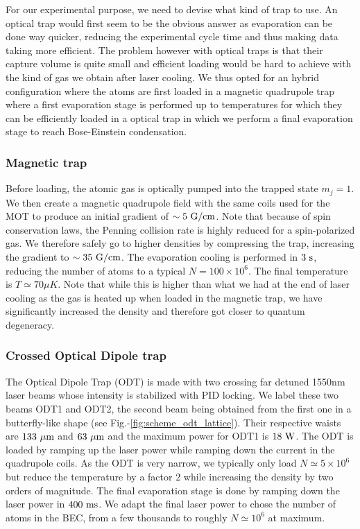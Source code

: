 For our experimental purpose, we need to devise what kind of trap to use. An optical trap would first seem to be the obvious answer as evaporation can be done way quicker, reducing the experimental cycle time and thus making data taking more efficient. The problem however with optical traps is that their capture volume is quite small and efficient loading would be hard to achieve with the kind of gas we obtain after laser cooling. We thus opted for an hybrid configuration where the atoms are first loaded in a magnetic quadrupole trap where a first evaporation stage is performed up to temperatures for which they can be efficiently loaded in a optical trap in which we perform a final evaporation stage to reach Bose-Einstein condensation.

\subsubsection{Magnetic trap}

Before loading, the atomic gas is optically pumped into the trapped state $m_j=1$. We then create a magnetic quadrupole field with the same coils used for the MOT to produce an initial gradient of $\sim 5 \ \rm{G/cm}$. Note that because of spin conservation laws, the Penning collision rate is highly reduced for a spin-polarized gas. We therefore safely go to higher densities by compressing the trap, increasing the gradient to $\sim 35 \ \rm{G/cm}$. The evaporation cooling is performed in $3 \ \rm{s}$, reducing the number of atoms to a typical $N=100 \times 10^6$. The final temperature is $T \simeq 70 \mu K$. Note that while this is higher than what we had at the end of laser cooling as the gas is heated up when loaded in the magnetic trap, we have significantly increased the density and therefore got closer to quantum degeneracy.

\subsubsection{Crossed Optical Dipole trap}

The Optical Dipole Trap (ODT) is made with two crossing far detuned 1550nm laser beams whose intensity is stabilized with PID locking. We label these two beams ODT1 and ODT2, the second beam being obtained from the first one in a butterfly-like shape (see Fig.-\ref{fig:scheme_odt_lattice}). Their respective waists are $133 \ \mu \rm{m}$ and $63 \ \mu \rm{m}$ and the maximum power for ODT1 is $18 \ \rm{W}$. The ODT is loaded by ramping up the laser power while ramping down the current in the quadrupole coils. As the ODT is very narrow, we typically only load $N \simeq 5 \times 10^6$ but reduce the temperature by a factor 2 while increasing the density by two orders of magnitude. The final evaporation stage is done by ramping down the laser power in $400 \ \rm{ms}$. We adapt the final laser power to chose the number of atoms in the BEC, from a few thousands to roughly $N \simeq 10^6$ at maximum.


